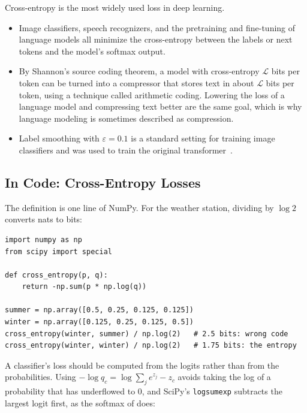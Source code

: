 \begin{aibox}
  Cross-entropy is the most widely used loss in deep learning.
  \begin{itemize}
    \item Image classifiers, speech recognizers, and the pretraining and
      fine-tuning of language models all minimize the cross-entropy
      between the labels or next tokens and the model's softmax output.
    \item By Shannon's source coding theorem, a model with cross-entropy
      $\mathcal{L}$ bits per token can be turned into a compressor that
      stores text in about $\mathcal{L}$ bits per token, using a
      technique called arithmetic coding. Lowering the loss of a language
      model and compressing text better are the same goal, which is why
      language modeling is sometimes described as compression.
    \item Label smoothing with $\varepsilon = 0.1$ is a standard setting
      for training image classifiers and was used to train the original
      transformer~\cite{vaswani2017attention}.
  \end{itemize}
\end{aibox}

\subsection{In Code: Cross-Entropy Losses}
\label{sec:ch07-ce-code}

The definition is one line of NumPy. For the weather station, dividing by
$\log 2$ converts nats to bits:

\begin{lstlisting}
import numpy as np
from scipy import special

def cross_entropy(p, q):
    return -np.sum(p * np.log(q))

summer = np.array([0.5, 0.25, 0.125, 0.125])
winter = np.array([0.125, 0.25, 0.125, 0.5])
cross_entropy(winter, summer) / np.log(2)   # 2.5 bits: wrong code
cross_entropy(winter, winter) / np.log(2)   # 1.75 bits: the entropy
\end{lstlisting}

A classifier's loss should be computed from the logits rather than from
the probabilities. Using $-\log q_c = \log\sum_j e^{z_j} - z_c$ avoids
taking the log of a probability that has underflowed to $0$, and SciPy's
\texttt{logsumexp} subtracts the largest logit first, as the softmax of
 does:

